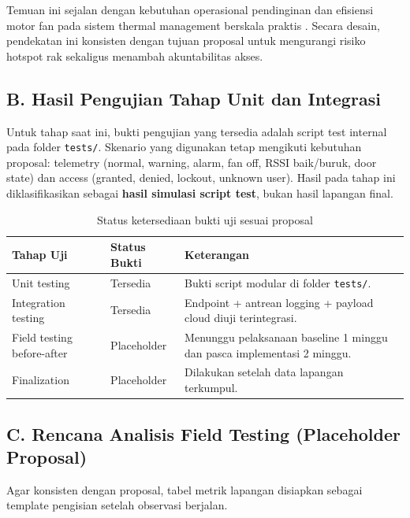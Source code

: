 \documentclass[10pt,a4paper,twocolumn]{article}
\begin{document}
Temuan ini sejalan dengan kebutuhan operasional pendinginan dan efisiensi motor fan pada sistem thermal management berskala praktis \citep{sen2025}. Secara desain, pendekatan ini konsisten dengan tujuan proposal untuk mengurangi risiko hotspot rak sekaligus menambah akuntabilitas akses.

\subsection*{B. Hasil Pengujian Tahap Unit dan Integrasi}
Untuk tahap saat ini, bukti pengujian yang tersedia adalah script test internal pada folder \texttt{tests/}. Skenario yang digunakan tetap mengikuti kebutuhan proposal: telemetry (normal, warning, alarm, fan off, RSSI baik/buruk, door state) dan access (granted, denied, lockout, unknown user). Hasil pada tahap ini diklasifikasikan sebagai \textbf{hasil simulasi script test}, bukan hasil lapangan final.

\begin{table}[h]
\centering
\caption{Status ketersediaan bukti uji sesuai proposal}
\label{tab:uijstatus}
\begin{tabularx}{0.98\columnwidth}{p{}p{}Y}
\toprule
\textbf{Tahap Uji} & \textbf{Status Bukti} & \textbf{Keterangan} \\\midrule
Unit testing & Tersedia & Bukti script modular di folder \texttt{tests/}. \\
Integration testing & Tersedia & Endpoint + antrean logging + payload cloud diuji terintegrasi. \\
Field testing before-after & Placeholder & Menunggu pelaksanaan baseline 1 minggu dan pasca implementasi 2 minggu. \\
Finalization & Placeholder & Dilakukan setelah data lapangan terkumpul. \\
\bottomrule
\end{tabularx}
\end{table}

\subsection*{C. Rencana Analisis Field Testing (Placeholder Proposal)}
Agar konsisten dengan proposal, tabel metrik lapangan disiapkan sebagai template pengisian setelah observasi berjalan.
\end{document}
